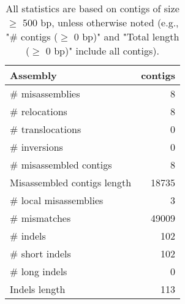 \documentclass[12pt,a4paper]{article}
\begin{document}
\begin{table}[ht]
\begin{center}
\caption{All statistics are based on contigs of size $\geq$ 500 bp, unless otherwise noted (e.g., "\# contigs ($\geq$ 0 bp)" and "Total length ($\geq$ 0 bp)" include all contigs).}
\begin{tabular}{|l*{1}{|r}|}
\hline
Assembly & contigs \\ \hline
\# misassemblies & 8 \\ \hline
\hspace{5mm}\# relocations & 8 \\ \hline
\hspace{5mm}\# translocations & 0 \\ \hline
\hspace{5mm}\# inversions & 0 \\ \hline
\# misassembled contigs & 8 \\ \hline
Misassembled contigs length & 18735 \\ \hline
\# local misassemblies & 3 \\ \hline
\# mismatches & 49009 \\ \hline
\# indels & 102 \\ \hline
\hspace{5mm}\# short indels & 102 \\ \hline
\hspace{5mm}\# long indels & 0 \\ \hline
Indels length & 113 \\ \hline
\end{tabular}
\end{center}
\end{table}
\end{document}
